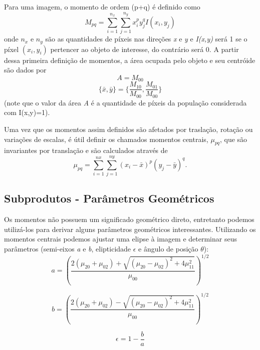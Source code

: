 Para uma imagem, o momento de ordem (p+q) é definido como
\begin{equation}
M_{pq} =\sum_{i=1}^{n_x} \sum_{j=1}^{n_y} x_{i}^p y_{j}^q I(x_i,y_j)
\end{equation}
onde $n_x$ e $n_y$ são as quantidades de píxeis nas direções \textit{x} e \textit{y} e \textit{I(x,y)} será 1 se o píxel $(x_i,y_i)$ pertencer ao objeto de interesse, do contrário será 0. A partir dessa primeira definição de momentos, a área ocupada pelo objeto e seu centróide são dados por
\begin{equation}
A = M_{00} 
\end{equation}
\begin{equation}
\{\bar{x},\bar{y}\} = \{\frac{M_{10}}{M_{00}}, \frac{M_{01}}{M_{00}} \}
\end{equation}
(note que o valor da área \textit{A} é a quantidade de píxeis da população considerada com I(x,y)=1).

Uma vez que os momentos assim definidos são afetados por traslação, rotação ou variações de escalas, é útil definir os chamados momentos centrais, $\mu_{pq}$, que são invariantes por translação e são calculados através de
\begin{equation}
\mu_{pq}= \sum_{i=1}^{nx} \sum_{j=1}^{ny} (x_i - \bar{x})^p (y_j - \bar{y})^ q .
\end{equation}

\subsection{Subprodutos - Parâmetros Geométricos}
Os momentos não possuem um significado geométrico direto, entretanto podemos utilizá-los para derivar alguns  parâmetros geométricos interessantes. Utilizando os momentos centrais podemos ajustar uma elipse \`a imagem e determinar seus parâmetros (semi-eixos \textit{a} e \textit{b}, elipticidade $\epsilon$ e ângulo de posição $\theta$):
\begin{equation}
a = \left(\frac{2(\mu_{20}+\mu_{02}) + \sqrt{(\mu_{20}-\mu_{02})^2 + 4\mu_{11}^2}}{\mu_{00}}\right)^{1/2}
\end{equation}

\begin{equation}
b = \left(\frac{2(\mu_{20}+\mu_{02}) - \sqrt{(\mu_{20}-\mu_{02})^2 + 4\mu_{11}^2}}{\mu_{00}}\right)^{1/2}
\end{equation}

\begin{equation}
\epsilon=1 -\frac{b}{a}
\end{equation}

